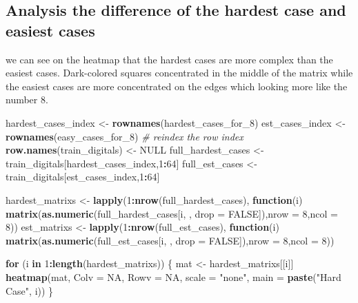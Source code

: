 \documentclass[
]{article}
\newenvironment{Shaded}{\begin{snugshade}}{\end{snugshade}}
\newcommand{\AttributeTok}[1]{\textcolor[rgb]{0.13,0.29,0.53}{#1}}
\newcommand{\CommentTok}[1]{\textcolor[rgb]{0.56,0.35,0.01}{\textit{#1}}}
\newcommand{\ConstantTok}[1]{\textcolor[rgb]{0.56,0.35,0.01}{#1}}
\newcommand{\ControlFlowTok}[1]{\textcolor[rgb]{0.13,0.29,0.53}{\textbf{#1}}}
\newcommand{\DecValTok}[1]{\textcolor[rgb]{0.00,0.00,0.81}{#1}}
\newcommand{\FunctionTok}[1]{\textcolor[rgb]{0.13,0.29,0.53}{\textbf{#1}}}
\newcommand{\NormalTok}[1]{#1}
\newcommand{\OtherTok}[1]{\textcolor[rgb]{0.56,0.35,0.01}{#1}}
\newcommand{\SpecialCharTok}[1]{\textcolor[rgb]{0.81,0.36,0.00}{\textbf{#1}}}
\newcommand{\StringTok}[1]{\textcolor[rgb]{0.31,0.60,0.02}{#1}}
\begin{document}
\subsection{Analysis the difference of the hardest case and easiest
cases}\label{analysis-the-difference-of-the-hardest-case-and-easiest-cases}

we can see on the heatmap that the hardest cases are more complex than
the easiest cases. Dark-colored squares concentrated in the middle of
the matrix while the easiest cases are more concentrated on the edges
which looking more like the number 8.

\begin{Shaded}
\begin{Highlighting}[]
\NormalTok{hardest\_cases\_index }\OtherTok{\textless{}{-}} \FunctionTok{rownames}\NormalTok{(hardest\_cases\_for\_8)}
\NormalTok{est\_cases\_index }\OtherTok{\textless{}{-}} \FunctionTok{rownames}\NormalTok{(easy\_cases\_for\_8)}
\CommentTok{\# reindex the row index}
\FunctionTok{row.names}\NormalTok{(train\_digitals) }\OtherTok{\textless{}{-}} \ConstantTok{NULL}
\NormalTok{full\_hardest\_cases }\OtherTok{\textless{}{-}}\NormalTok{ train\_digitals[hardest\_cases\_index,}\DecValTok{1}\SpecialCharTok{:}\DecValTok{64}\NormalTok{]}
\NormalTok{full\_est\_cases }\OtherTok{\textless{}{-}}\NormalTok{ train\_digitals[est\_cases\_index,}\DecValTok{1}\SpecialCharTok{:}\DecValTok{64}\NormalTok{]}

\NormalTok{hardest\_matrixs }\OtherTok{\textless{}{-}} \FunctionTok{lapply}\NormalTok{(}\DecValTok{1}\SpecialCharTok{:}\FunctionTok{nrow}\NormalTok{(full\_hardest\_cases), }\ControlFlowTok{function}\NormalTok{(i) }\FunctionTok{matrix}\NormalTok{(}\FunctionTok{as.numeric}\NormalTok{(full\_hardest\_cases[i, , }\AttributeTok{drop =} \ConstantTok{FALSE}\NormalTok{]),}\AttributeTok{nrow =} \DecValTok{8}\NormalTok{,}\AttributeTok{ncol =} \DecValTok{8}\NormalTok{))}
\NormalTok{est\_matrixs }\OtherTok{\textless{}{-}} \FunctionTok{lapply}\NormalTok{(}\DecValTok{1}\SpecialCharTok{:}\FunctionTok{nrow}\NormalTok{(full\_est\_cases), }\ControlFlowTok{function}\NormalTok{(i) }\FunctionTok{matrix}\NormalTok{(}\FunctionTok{as.numeric}\NormalTok{(full\_est\_cases[i, , }\AttributeTok{drop =} \ConstantTok{FALSE}\NormalTok{]),}\AttributeTok{nrow =} \DecValTok{8}\NormalTok{,}\AttributeTok{ncol =} \DecValTok{8}\NormalTok{))}

\ControlFlowTok{for}\NormalTok{ (i }\ControlFlowTok{in} \DecValTok{1}\SpecialCharTok{:}\FunctionTok{length}\NormalTok{(hardest\_matrixs)) \{}
\NormalTok{mat }\OtherTok{\textless{}{-}}\NormalTok{ hardest\_matrixs[[i]]}
\FunctionTok{heatmap}\NormalTok{(mat, }\AttributeTok{Colv =} \ConstantTok{NA}\NormalTok{, }\AttributeTok{Rowv =} \ConstantTok{NA}\NormalTok{, }\AttributeTok{scale =} \StringTok{"none"}\NormalTok{, }\AttributeTok{main =} \FunctionTok{paste}\NormalTok{(}\StringTok{"Hard Case"}\NormalTok{, i))}
\NormalTok{\}}
\end{Highlighting}
\end{Shaded}
\end{document}
